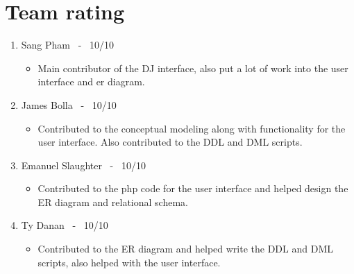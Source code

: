\documentclass{report}
\begin{document}
\section{Team rating}
\begin{enumerate}
    \item Sang Pham \ - \ 10/10
        \begin{itemize}[label=$\circ$]
            \item Main contributor of the DJ interface, also put a lot of work into the user interface and er diagram.
        \end{itemize}
    \item  James Bolla \ - \ 10/10 
        \begin{itemize}[label=$\circ$]
        \item Contributed to the conceptual modeling along with functionality for the user interface. Also contributed to the DDL and DML scripts.
        \end{itemize}
    \item Emanuel Slaughter \ - \ 10/10 
        \begin{itemize}[label=$\circ$]
            \item Contributed to the php code for the user interface and helped design the ER diagram and relational schema.
        \end{itemize}
    \item Ty Danan  \ - \ 10/10
        \begin{itemize}[label=$\circ$]
        \item Contributed to the ER diagram and helped write the DDL and DML scripts, also helped with the user interface.
        \end{itemize}
\end{enumerate}
\end{document}
